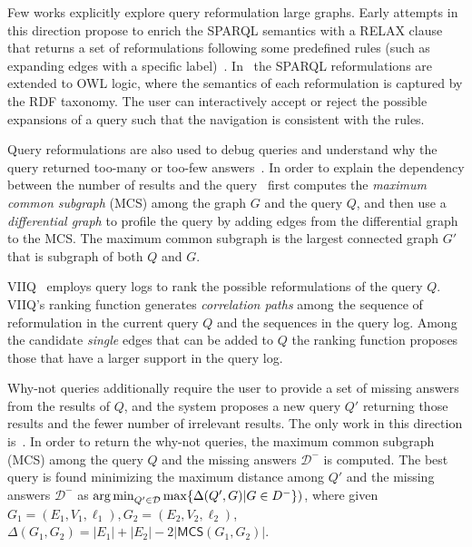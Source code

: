 Few works explicitly explore query reformulation large graphs.
Early attempts in this direction propose to enrich the SPARQL semantics with a \textsc{RELAX} clause that returns a set of reformulations following some predefined rules (such as expanding edges with a specific label)~\citep{hurtado2008query}.
In~\citep{arenas2014faceted} the SPARQL reformulations are extended to OWL logic, where the semantics of each reformulation is captured by the RDF taxonomy. 
The user can interactively accept or reject the possible expansions of a query such that the navigation is consistent with the rules. 

Query reformulations are also used to debug queries and understand why the query returned too-many or too-few answers~\citep{vasilyeva2016answering}. 
In order to explain the dependency between the number of results and the query~\citep{vasilyeva2016answering} first computes the \emph{maximum common subgraph} (MCS) among the graph $G$ and the query $Q$, and then use a \emph{differential graph} to profile the query by adding edges from the differential graph to the MCS. 
The maximum common subgraph is the largest connected graph $G'$ that is subgraph of both $Q$ and $G$. 

VIIQ~\cite{jayaram2015viiq} employs query logs to rank the possible reformulations of the query $Q$. 
VIIQ's ranking function generates \emph{correlation paths} among the sequence of reformulation in the current query $Q$ and the sequences in the query log. 
Among the candidate \emph{single} edges that can be added to $Q$ the ranking function proposes those that have a larger support in the query log. 



Why-not queries additionally require the user to provide a set of missing answers from the results of $Q$, and the system proposes a new query $Q'$ returning those results and the fewer number of irrelevant results. 
The only work in this direction is~\cite{islam2015efficient}. 
In order to return the why-not queries, the maximum common subgraph (MCS) among the query $Q$ and the missing answers $\mathcal{D}^-$ is computed. The best query is found minimizing the maximum distance among $Q'$ and the missing answers $\mathcal{D}^-$ as $\operatorname*{\arg\min}_{Q'\in \mathcal{D}} \max\{\Delta(Q',G)|G \in D^{-}\})$, where given $G_1 = (E_1,V_1, \ell_1), G_2 = (E_2,V_2, \ell_2)$, $\Delta(G_1, G_2) = |E_1| + |E_2| - 2 |\mathsf{MCS}(G_1,G_2)|$. 


